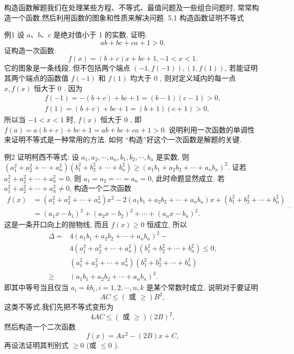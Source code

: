 
构造函数解题我们在处理某些方程、不等式、最值问题及一些组合问题时, 常常构造一个函数,然后利用函数的图象和性质来解决问题.
5.1 构造函数证明不等式



例1 设 $a 、 b 、 c$ 是绝对值小于 1 的实数, 证明:
$$
a b+b c+c a+1>0 .
$$
证构造一次函数:
$$
f(x)=(b+c) x+b c+1,-1<x<1 .
$$
它的图象是一条线段, 但不包括两个端点 $(-1, f(-1)),(1, f(1))$, 若能证明其两个端点的函数值 $f(-1)$ 和 $f(1)$ 均大于 0 , 则对定义域内的每一点 $x, f(x)$ 恒大于 0 .
因为
$$
\begin{gathered}
f(-1)=-(b+c)+b c+1=(b-1)(c-1)>0, \\
f(1)=(b+c)+b c+1=(b+1)(c+1)>0,
\end{gathered}
$$
所以当 $-1<x<1$ 时, $f(x)$ 恒大于 0 ,
即 $f(a)=a(b+c)+b c+1=a b+b c+c a+1>0$.
说明利用一次函数的单调性来证明不等式是一种常用的方法.
如何 “构造”好这个一次函数是解题的关键.



例2 证明柯西不等式: 设 $a_1, a_2, \cdots, a_n, b_1, b_2, \cdots, b_n$ 是实数, 则 $\left(a_1^2+a_2^2+\cdots+a_n^2\right)\left(b_1^2+b_2^2+\cdots+b_n^2\right) \geqslant\left(a_1 b_1+a_2 b_2+\cdots+a_n b_n\right)^2$.
证若 $a_1^2+a_2^2+\cdots+a_n^2=0$, 则 $a_1=a_2=\cdots=a_n=0$, 此时命题显然成立.
若 $a_1^2+a_2^2+\cdots+a_n^2 \neq 0$, 构造一个二次函数
$$
\begin{aligned}
f(x) & =\left(a_1^2+a_2^2+\cdots+a_n^2\right) x^2-2\left(a_1 b_1+a_2 b_2+\cdots+a_n b_n\right) x+\left(b_1^2+b_2^2+\cdots+b_n^2\right) \\
& =\left(a_1 x-b_1\right)^2+\left(a_2 x-b_2\right)^2+\cdots+\left(a_n x-b_n\right)^2 .
\end{aligned} .
$$
这是一条开口向上的抛物线, 而且 $f(x) \geqslant 0$ 恒成立, 所以
$$
\begin{aligned}
\Delta= & 4\left(a_1 b_1+a_2 b_2+\cdots+a_n b_n\right)^2- \\
& 4\left(a_1^2+a_2^2+\cdots+a_n^2\right)\left(b_1^2+b_2^2+\cdots+b_n^2\right) \leqslant 0, \\
& \left(a_1^2+a_2^2+\cdots+a_n^2\right)\left(b_1^2+b_2^2+\cdots+b_n^2\right) \\
\geqslant & \left(a_1 b_1+a_2 b_2+\cdots+a_n b_n\right)^2 .
\end{aligned}
$$
即其中等号当且仅当 $a_i=k b_i, i=1,2, \cdots, n, k$ 是某个常数时成立.
说明对于要证明
$$
A C \leqslant(\text { 或 } \geqslant) B^2,
$$
这类不等式,我们先把不等式变形为
$$
4 A C \leqslant(\text { 或 } \geqslant)(2 B)^2,
$$
然后构造一个二次函数
$$
f(x)=A x^2-(2 B) x+C,
$$
再设法证明其判别式 $\geqslant 0$ (或 $\leqslant 0$ ).



